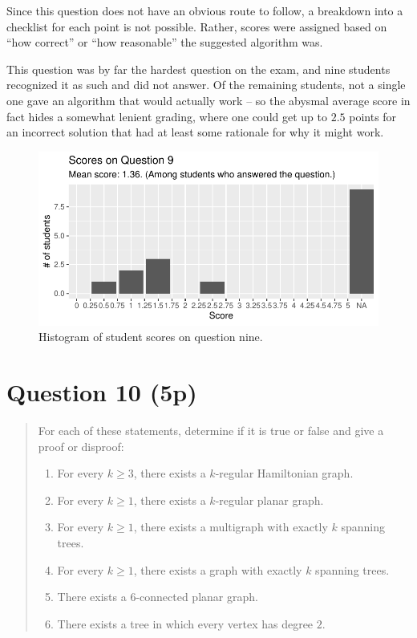 \documentclass[nobib]{tufte-handout}
\begin{document}
Since this question does not have an obvious route to follow, a breakdown into a checklist for each point is not possible. Rather, scores were assigned based on ``how correct'' or ``how reasonable'' the suggested algorithm was.

This question was by far the hardest question on the exam, and nine students recognized it as such and did not answer. Of the remaining students, not a single one gave an algorithm that would actually work -- so the abysmal average score in fact hides a somewhat lenient grading, where one could get up to $2.5$ points for an incorrect solution that had at least some rationale for why it might work.

\begin{figure}[p]
  \centering
  \includegraphics[width = \textwidth]{Q9.pdf}
  \caption[Score histogram for Q9]{Histogram of student scores on question nine.}
  \label{fig:Q9}
\end{figure}

\section{Question 10 (5p)} %

\begin{quotation}
  For each of these statements, determine if it is true or false and give a proof or disproof:
  \begin{enumerate}[label=\alph*)]
    \item For every $k\geq 3$, there exists a $k$-regular Hamiltonian graph.
    \item For every $k \geq 1$, there exists a $k$-regular planar graph.
    \item For every $k \geq 1$, there exists a multigraph with exactly $k$ spanning trees.
    \item For every $k \geq 1$, there exists a graph with exactly $k$ spanning trees.
    \item There exists a $6$-connected planar graph.
    \item There exists a tree in which every vertex has degree $2$.
  \end{enumerate}
\end{quotation}
\end{document}
